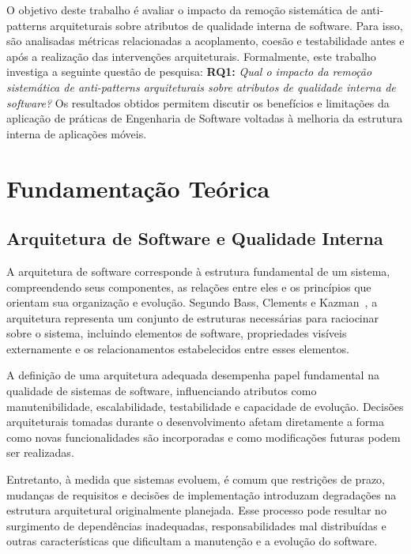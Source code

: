 \documentclass[sigconf,anonymous]{acmart}
\begin{document}
O objetivo deste trabalho é avaliar o impacto da remoção sistemática de anti-patterns arquiteturais sobre atributos de qualidade interna de software. Para isso, são analisadas métricas relacionadas a acoplamento, coesão e testabilidade antes e após a realização das intervenções arquiteturais. Formalmente, este trabalho investiga a seguinte questão de pesquisa: \textbf{RQ1:} \textit{Qual o impacto da remoção sistemática de anti-patterns arquiteturais sobre atributos de qualidade interna de software?} Os resultados obtidos permitem discutir os benefícios e limitações da aplicação de práticas de Engenharia de Software voltadas à melhoria da estrutura interna de aplicações móveis.



\section{Fundamentação Teórica}

\subsection{Arquitetura de Software e Qualidade Interna}

A arquitetura de software corresponde à estrutura fundamental de um sistema, compreendendo seus componentes, as relações entre eles e os princípios que orientam sua organização e evolução. Segundo Bass, Clements e Kazman~\cite{Bass2012}, a arquitetura representa um conjunto de estruturas necessárias para raciocinar sobre o sistema, incluindo elementos de software, propriedades visíveis externamente e os relacionamentos estabelecidos entre esses elementos.

A definição de uma arquitetura adequada desempenha papel fundamental na qualidade de sistemas de software, influenciando atributos como manutenibilidade, escalabilidade, testabilidade e capacidade de evolução. Decisões arquiteturais tomadas durante o desenvolvimento afetam diretamente a forma como novas funcionalidades são incorporadas e como modificações futuras podem ser realizadas.

Entretanto, à medida que sistemas evoluem, é comum que restrições de prazo, mudanças de requisitos e decisões de implementação introduzam degradações na estrutura arquitetural originalmente planejada. Esse processo pode resultar no surgimento de dependências inadequadas, responsabilidades mal distribuídas e outras características que dificultam a manutenção e a evolução do software.
\end{document}
